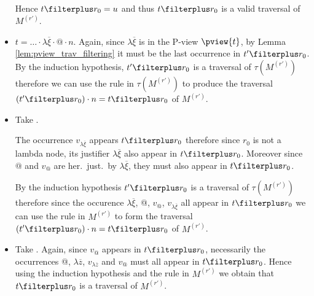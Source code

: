\begin{itemize}
        Hence $t \filterplus r_0 = u$ and thus $t \filterplus r_0$ is a valid traversal of $M^{(r')}$.

    \item {} $t = \ldots \cdot \lambda \overline{\xi} \cdot @ \cdot n$.
        Again, since $\lambda \overline{\xi}$ is in the P-view
        $\pview{t}$, by Lemma \ref{lem:pview_trav_filtering} it must
        be the last occurrence in $t'\filterplus r_0$. By the
        induction hypothesis, $t' \filterplus r_0$ is a traversal of
        $\tau(M^{(r')})$ therefore we can use the rule
         in $\tau(M^{(r')})$ to produce the traversal
        $(t'\filterplus r_0) \cdot n = t \filterplus r_0$ of
        $M^{(r')}$.


    \item {} Take .

        The occurrence $v_{\lambda \overline{\xi}}$ appears
        $t\filterplus r_0$ therefore since $r_0$ is not a lambda
        node, its justifier $\lambda \overline{\xi}$ also appear in
        $t\filterplus r_0$. Moreover since $@$ and $v_@$ are her.\
        just.\ by $\lambda \overline{\xi}$, they must also appear in
        $t\filterplus r_0$.

        By the induction hypothesis $t' \filterplus r_0$ is a
        traversal of $\tau(M^{(r')})$ therefore since the occurence
        $\lambda \overline{\xi}$, @, $v_@$, $v_{\lambda
        \overline{\xi}}$ all appear in $t\filterplus r_0$ we can use
        the rule \rulenamet{Value$^{@\mapsto\lambda}$} in $M^{(r')}$
        to form the traversal $(t'\filterplus r_0) \cdot n = t
        \filterplus r_0$ of $M^{(r')}$.

    \item {}
          Take . Again, since $v_@$ appears in $t
        \filterplus r_0$, necessarily the occurrences @, $\lambda
        \overline{z}$, $v_{\lambda \overline{z}}$ and $v_@$ must all
        appear in $t \filterplus r_0$. Hence using the induction
        hypothesis and the rule
         in $M^{(r')}$ we
        obtain that $t \filterplus r_0$ is a traversal of
        $M^{(r')}$.


\end{itemize}
